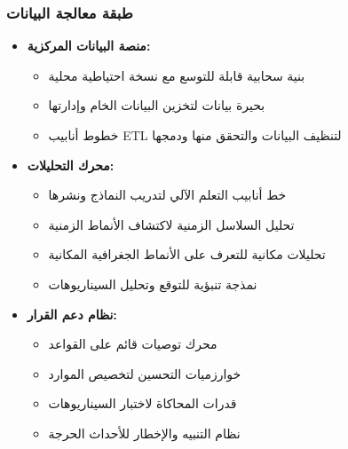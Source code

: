 \subsubsection{طبقة معالجة البيانات}
\begin{itemize}
    \item \textbf{منصة البيانات المركزية:}
    \begin{itemize}
        \item بنية سحابية قابلة للتوسع مع نسخة احتياطية محلية
        \item بحيرة بيانات لتخزين البيانات الخام وإدارتها
        \item خطوط أنابيب ETL لتنظيف البيانات والتحقق منها ودمجها
    \end{itemize}
    
    \item \textbf{محرك التحليلات:}
    \begin{itemize}
        \item خط أنابيب التعلم الآلي لتدريب النماذج ونشرها
        \item تحليل السلاسل الزمنية لاكتشاف الأنماط الزمنية
        \item تحليلات مكانية للتعرف على الأنماط الجغرافية المكانية
        \item نمذجة تنبؤية للتوقع وتحليل السيناريوهات
    \end{itemize}
    
    \item \textbf{نظام دعم القرار:}
    \begin{itemize}
        \item محرك توصيات قائم على القواعد
        \item خوارزميات التحسين لتخصيص الموارد
        \item قدرات المحاكاة لاختبار السيناريوهات
        \item نظام التنبيه والإخطار للأحداث الحرجة
    \end{itemize}
\end{itemize}

